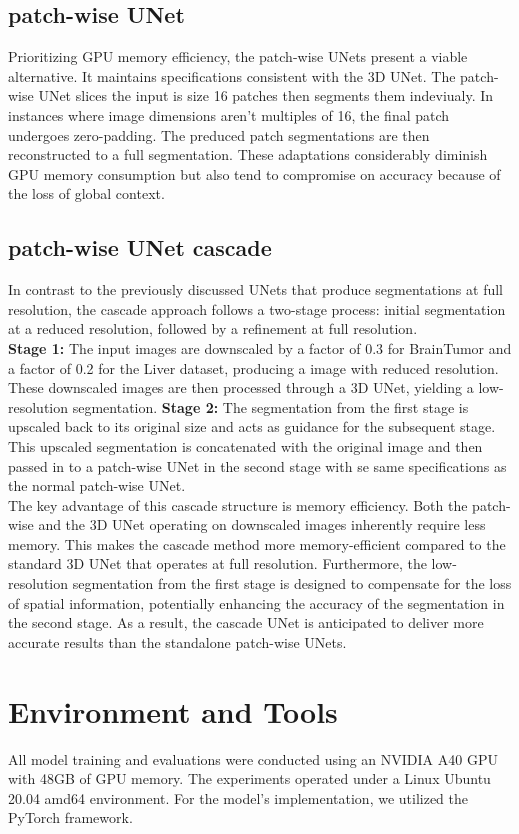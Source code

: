 \subsection{patch-wise UNet}
Prioritizing GPU memory efficiency, the patch-wise UNets present a viable alternative. It maintains specifications consistent with the 3D UNet.
The patch-wise UNet slices the input is size 16 patches then segments them indeviualy. In instances where image dimensions aren't multiples of 16, the final patch undergoes zero-padding.
The preduced patch segmentations are then reconstructed to a full segmentation.
These adaptations considerably diminish GPU memory consumption but also tend to compromise on accuracy because of the loss of global context.

\subsection{patch-wise UNet cascade}
In contrast to the previously discussed UNets that produce segmentations at full resolution, the cascade approach follows a two-stage process:
initial segmentation at a reduced resolution, followed by a refinement at full resolution.\\
\textbf{Stage 1:}
The input images are downscaled by a factor of 0.3 for BrainTumor and a factor of 0.2 for the Liver dataset, producing a image with reduced resolution. These downscaled images are then processed through a 3D UNet,
yielding a low-resolution segmentation.
\textbf{Stage 2:}
The segmentation from the first stage is upscaled back to its original size and acts as guidance for the subsequent stage.
This upscaled segmentation is concatenated with the original image and then passed in to a patch-wise UNet in the second stage with se same specifications as the normal patch-wise UNet.\\

\noindent The key advantage of this cascade structure is memory efficiency. Both the patch-wise and the 3D UNet operating on downscaled images inherently require less memory.
This makes the cascade method more memory-efficient compared to the standard 3D UNet that operates at full resolution. Furthermore,
the low-resolution segmentation from the first stage is designed to compensate for the loss of spatial information, potentially enhancing the accuracy of the segmentation in the second stage.
As a result, the cascade UNet is anticipated to deliver more accurate results than the standalone patch-wise UNets.

\section{Environment and Tools}
All model training and evaluations were conducted using an NVIDIA A40 GPU with 48GB of GPU memory. The experiments operated under a Linux Ubuntu 20.04 amd64 environment. For the model's implementation,
we utilized the PyTorch framework.

